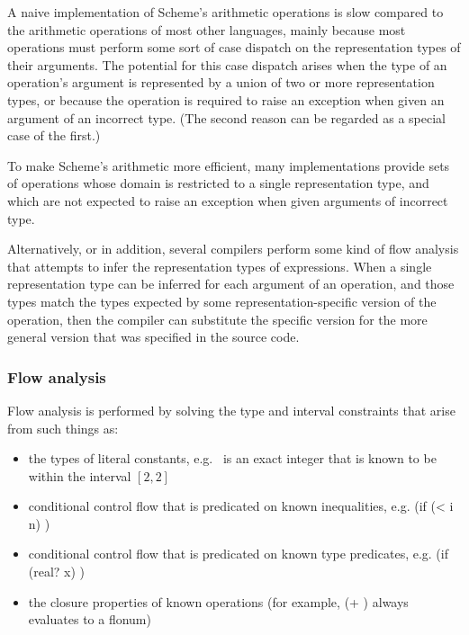 \documentclass[twoside,twocolumn]{algol60}
\begin{document}
A naive implementation of Scheme's arithmetic operations is slow
compared to the arithmetic operations of most other languages, mainly
because most operations must perform some sort of case dispatch on the
representation types of their arguments.  The potential for this case
dispatch arises when the type of an operation's argument is
represented by a union of two or more representation types, or because
the operation is required to raise an exception when given an argument of
an incorrect type.  (The second reason can be regarded as a special
case of the first.)

To make Scheme's arithmetic more efficient, many implementations
provide sets of operations whose domain is restricted to a single
representation type, and which are not expected to raise an exception
when given arguments of incorrect type.

Alternatively, or in addition, several compilers perform some kind of
flow analysis that attempts to infer the representation types of
expressions.  When a single representation type can be inferred for
each argument of an operation, and those types match the types
expected by some representation-specific version of the operation,
then the compiler can substitute the specific version for the more
general version that was specified in the source code.

\subsubsection{Flow analysis}

Flow analysis is performed by solving the type and interval
constraints that arise from such things as:

\begin{itemize}
\item the types of literal constants, e.g.\ {} is an exact integer
  that is known to be within the interval $[2,2]$
  
\item conditional control flow that is predicated on known
  inequalities, e.g. {\cf (if (< i n)  )}
  
\item conditional control flow that is predicated on known type
  predicates, e.g. {\cf (if (real? x)  )}
  
\item the closure properties of known operations (for example, {\cf (+
     )} always evaluates to a flonum)
\end{itemize}
  
\end{document}
